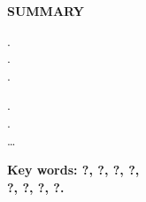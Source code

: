 \begin{center}

\hr

\textbf{SUMMARY}

\end{center}

.\\
.\\
.

.\\
.\\
…

\textbf{Key words: ?, ?, ?, ?,\\
?, ?, ?, ?.}
